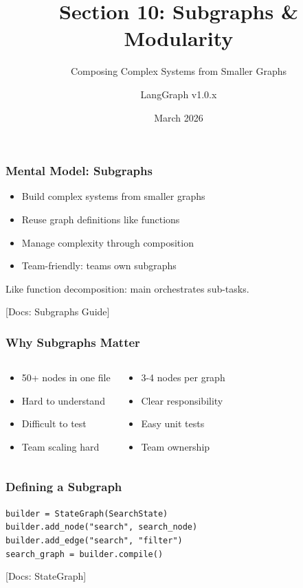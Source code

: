 \documentclass[aspectratio=169,11pt]{beamer}
\title{Section 10: Subgraphs \& Modularity}
\subtitle{Composing Complex Systems from Smaller Graphs}
\author{LangGraph v1.0.x}
\date{March 2026}
\newcommand{\docref}[1]{{\scriptsize\color{docgray}[Docs: #1]}}
\begin{document}
\frame{\titlepage}

\begin{frame}
\frametitle{Mental Model: Subgraphs}
\begin{conceptbox}
\setlength{\itemsep}{1pt}
\begin{itemize}
\item Build complex systems from smaller graphs
\item Reuse graph definitions like functions
\item Manage complexity through composition
\item Team-friendly: teams own subgraphs
\end{itemize}
\end{conceptbox}
\vspace{0.1cm}
\begin{tipbox}[Analogy]
Like function decomposition: main orchestrates sub-tasks.
\end{tipbox}
\docref{Subgraphs Guide}
\end{frame}

\begin{frame}
\frametitle{Why Subgraphs Matter}
\begin{columns}[T]
\begin{warningbox}
\setlength{\itemsep}{1pt}
\begin{itemize}
\item 50+ nodes in one file
\item Hard to understand
\item Difficult to test
\item Team scaling hard
\end{itemize}
\end{warningbox}
\begin{tipbox}
\setlength{\itemsep}{1pt}
\begin{itemize}
\item 3-4 nodes per graph
\item Clear responsibility
\item Easy unit tests
\item Team ownership
\end{itemize}
\end{tipbox}
\end{columns}
\end{frame}

\begin{frame}
\frametitle{Defining a Subgraph}
\begin{tipbox}
\texttt{builder = StateGraph(SearchState)}\\
\texttt{builder.add\_node("search", search\_node)}\\
\texttt{builder.add\_edge("search", "filter")}\\
\texttt{search\_graph = builder.compile()}
\end{tipbox}
\docref{StateGraph}
\end{frame}
\end{document}
